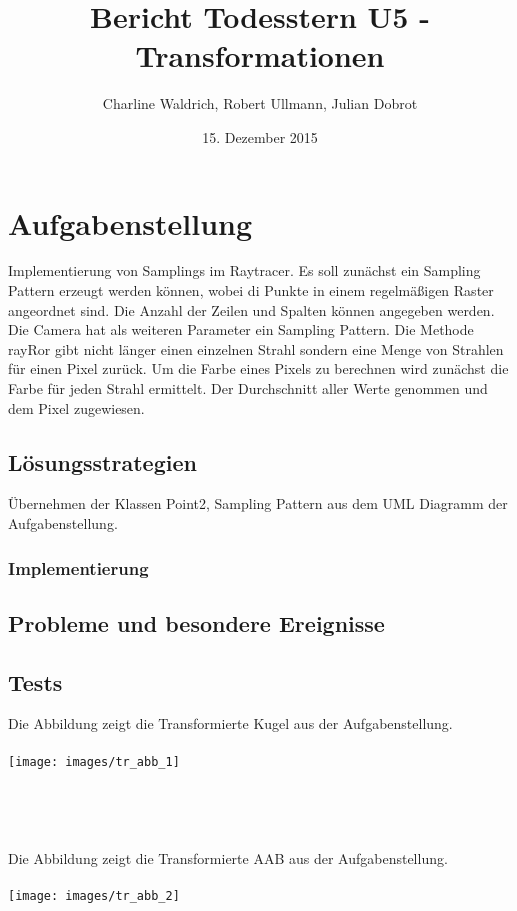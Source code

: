 \documentclass[14pt]{extarticle}
\title{Bericht Todesstern U5 - Transformationen}
\author{Charline Waldrich, Robert Ullmann, Julian Dobrot}
\date{15. Dezember 2015}
\begin{document}
\maketitle
\pagebreak
\tableofcontents

\section{Aufgabenstellung}
Implementierung von Samplings im Raytracer. Es soll zunächst ein Sampling Pattern erzeugt werden können, wobei di Punkte in einem regelmäßigen Raster angeordnet sind. Die Anzahl der Zeilen und Spalten können angegeben werden. Die Camera hat als weiteren Parameter ein Sampling Pattern. Die Methode rayRor gibt nicht länger einen einzelnen Strahl sondern eine Menge von Strahlen für einen Pixel zurück. Um die Farbe eines Pixels zu berechnen wird zunächst die Farbe für jeden Strahl ermittelt. Der Durchschnitt aller Werte genommen und dem Pixel zugewiesen. 
\subsection{Lösungsstrategien}
Übernehmen der Klassen Point2, Sampling Pattern aus dem UML Diagramm der Aufgabenstellung. 


\subsubsection{Implementierung}



\subsection{Probleme und besondere Ereignisse}


\subsection{Tests}
Die Abbildung zeigt die Transformierte Kugel aus der Aufgabenstellung.\\\\
\texttt{[image: images/tr\_abb\_1]}\\\\\\\\\\
Die Abbildung zeigt die Transformierte AAB aus der Aufgabenstellung.\\\\
\texttt{[image: images/tr\_abb\_2]}\\
\end{document}
